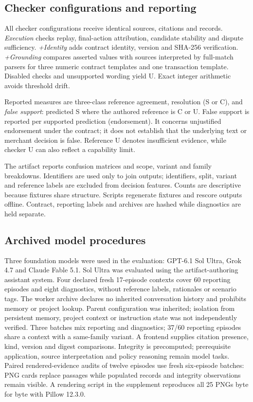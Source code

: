 \documentclass[sigconf,nonacm]{acmart}
\begin{document}
\subsection{Checker configurations and reporting}

All checker configurations receive identical sources, citations and records. \emph{Execution} checks replay, final-action attribution, candidate stability and dispute sufficiency. \emph{+Identity} adds contract identity, version and SHA-256 verification. \emph{+Grounding} compares asserted values with sources interpreted by full-match parsers for three numeric contract templates and one transaction template. Disabled checks and unsupported wording yield U. Exact integer arithmetic avoids threshold drift.

Reported measures are three-class reference agreement, resolution (S or C), and \emph{false support}: predicted S where the authored reference is C or U. False support is reported per supported prediction (endorsement). It concerns unjustified endorsement under the contract; it does not establish that the underlying text or merchant decision is false. Reference U denotes insufficient evidence, while checker U can also reflect a capability limit.

The artifact reports confusion matrices and scope, variant and family breakdowns. Identifiers are used only to join outputs; identifiers, split, variant and reference labels are excluded from decision features. Counts are descriptive because fixtures share structure. Scripts regenerate fixtures and rescore outputs offline. Contract, reporting labels and archives are hashed while diagnostics are held separate.

\subsection{Archived model procedures}

Three foundation models were used in the evaluation: GPT-6.1 Sol Ultra, Grok 4.7 and Claude Fable 5.1. Sol Ultra was evaluated using the artifact-authoring assistant system. Four declared fresh 17-episode contexts cover 60 reporting episodes and eight diagnostics, without reference labels, rationales or scenario tags. The worker archive declares no inherited conversation history and prohibits memory or project lookup. Parent configuration was inherited; isolation from persistent memory, project context or instruction state was not independently verified. Three batches mix reporting and diagnostics; 37/60 reporting episodes share a context with a same-family variant. A frontend supplies citation presence, kind, version and digest comparisons. Integrity is precomputed; prerequisite application, source interpretation and policy reasoning remain model tasks. Paired rendered-evidence audits of twelve episodes use fresh six-episode batches: PNG cards replace passages while populated records and integrity observations remain visible. A rendering script in the supplement reproduces all 25 PNGs byte for byte with Pillow 12.3.0.
\end{document}
